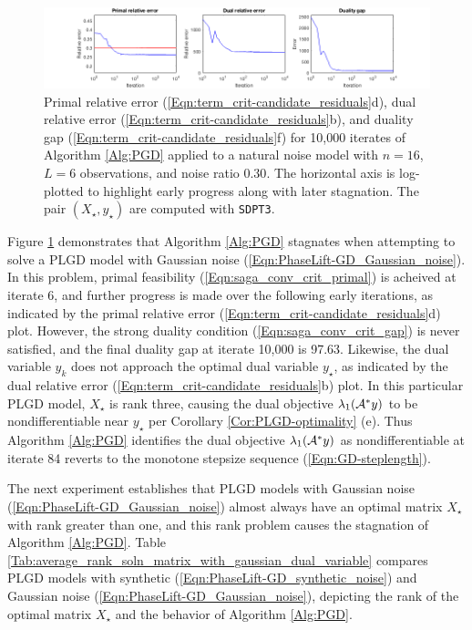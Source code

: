 \begin{figure}[H]
\hspace{-1.7cm}  \includegraphics[scale=0.6]{noisy_random_signal_relative_errors_stagnate}
\caption{Primal relative error (\ref{Eqn:term_crit-candidate_residuals}d), dual relative error (\ref{Eqn:term_crit-candidate_residuals}b), and duality gap (\ref{Eqn:term_crit-candidate_residuals}f) for 10,000 iterates of Algorithm \ref{Alg:PGD} applied to a natural noise model with $n=16$, $L=6$ observations, and noise ratio $0.30$.  The horizontal axis is log-plotted to highlight early progress along with later stagnation.  The pair $(X_\star, y_\star)$ are computed with \texttt{SDPT3}.}
\label{Fig:noisy_random_relative_errors_stagnate}
\end{figure}


Figure \ref{Fig:noisy_random_relative_errors_stagnate} demonstrates that Algorithm \ref{Alg:PGD} stagnates when attempting to solve a PLGD model with Gaussian noise (\ref{Eqn:PhaseLift-GD_Gaussian_noise}).  In this problem, primal feasibility (\ref{Eqn:saga_conv_crit_primal}) is acheived at iterate 6, and further progress is made over the following early iterations, as indicated by the primal relative error (\ref{Eqn:term_crit-candidate_residuals}d) plot.  However, the strong duality condition (\ref{Eqn:saga_conv_crit_gap}) is never satisfied, and the final duality gap at iterate 10,000 is 97.63.  Likewise, the dual variable $y_k$ does not approach the optimal dual variable $y_\star$, as indicated by the dual relative error (\ref{Eqn:term_crit-candidate_residuals}b) plot.  In this particular PLGD model, $X_\star$ is rank three, causing the dual objective $\lambda_1({\mathcal A}^*y)$ to be nondifferentiable near $y_\star$ per Corollary \ref{Cor:PLGD-optimality} (e).  Thus Algorithm \ref{Alg:PGD} identifies the dual objective $\lambda_1({\mathcal A}^*y)$ as nondifferentiable at iterate 84 reverts to the monotone stepsize sequence (\ref{Eqn:GD-steplength}).  


The next experiment establishes that PLGD models with Gaussian noise (\ref{Eqn:PhaseLift-GD_Gaussian_noise}) almost always have an optimal matrix $X_\star$ with rank greater than one, and this rank problem causes the stagnation of Algorithm \ref{Alg:PGD}.  Table \ref{Tab:average_rank_soln_matrix_with_gaussian_dual_variable} compares PLGD models with synthetic (\ref{Eqn:PhaseLift-GD_synthetic_noise}) and Gaussian noise (\ref{Eqn:PhaseLift-GD_Gaussian_noise}), depicting the rank of the optimal matrix $X_\star$ and the behavior of Algorithm \ref{Alg:PGD}.

